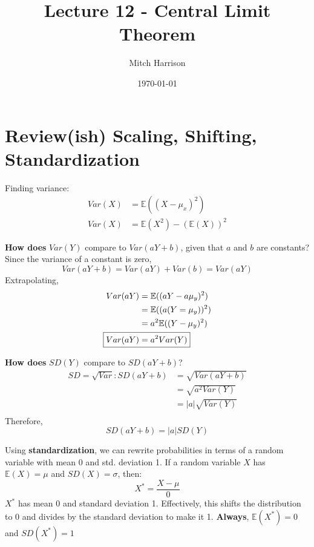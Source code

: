 \documentclass[titlepage, 12pt, leqno]{article}
\title{\Huge{Lecture 12 - Central Limit Theorem}}
\author{\large{Mitch Harrison}}
\date{\today}
\begin{document}
\setlength{\parskip}{1\baselineskip}
\setlength{\parindent}{15pt}
\maketitle
\tableofcontents
\newpage


\section{Review(ish) Scaling, Shifting, Standardization}
Finding variance:
\begin{align*}
    Var(X) &= \mathbb{E}((X-\mu_x)^2) \\
    Var(X) &= \mathbb{E}(X^2) - ( \mathbb{E}(X))^2
\end{align*}

\begin{ex}
    \textbf{How does} $Var(Y)$ compare to $Var(aY+b)$, given that $a$ and $b$ are 
    constants?
    \vspace{10px}
    Since the variance of a constant is zero,
    \[
    Var(aY + b) = Var(aY) + Var(b) = Var(aY)
    \]
    Extrapolating, 
   \begin{align*}
       Var(aY) &= \mathbb{E}((aY-a\mu_y)^2) \\
               &= \mathbb{E}((a(Y=\mu_y))^2) \\
               &= a^2 \mathbb{E}((Y-\mu_y)^2) \\
       \Aboxed{Var(aY) &= a^2 Var(Y)} 
   \end{align*}
\end{ex}

\begin{ex}
    \textbf{How does} $SD(Y)$ compare to $SD(aY+b)$?
    \vspace{10px}
   \begin{align*}
       SD = \sqrt{Var} : SD(aY+b) &= \sqrt{Var(aY+b)} \\
                                  &= \sqrt{a^2 Var(Y)} \\
                                  &= |a| \sqrt{Var(Y)} \\
   \end{align*}
   Therefore,
   \[
   \boxed{SD(aY+b) = |a| SD(Y)} 
   \]
\end{ex}

\begin{definition}
    Using \textbf{standardization}, we can rewrite probabilities in terms of a
    random variable with mean 0 and std. deviation 1.
    \vspace{10px}
    If a random variable $X$ has $ \mathbb{E}(X) = \mu$ and $SD(X) = \sigma$, 
    then:
    \[
        X^* = \frac{X-\mu}{0}
    \]
    $X^*$ has mean 0 and standard deviation 1. Effectively, this shifts the 
    distribution to 0 and divides by the standard deviation to make it 1.
    \vspace{10px}
    \textbf{Always}, $ \mathbb{E}(X^*) = 0$ and $SD(X^*) = 1$
\end{definition}
\end{document}
